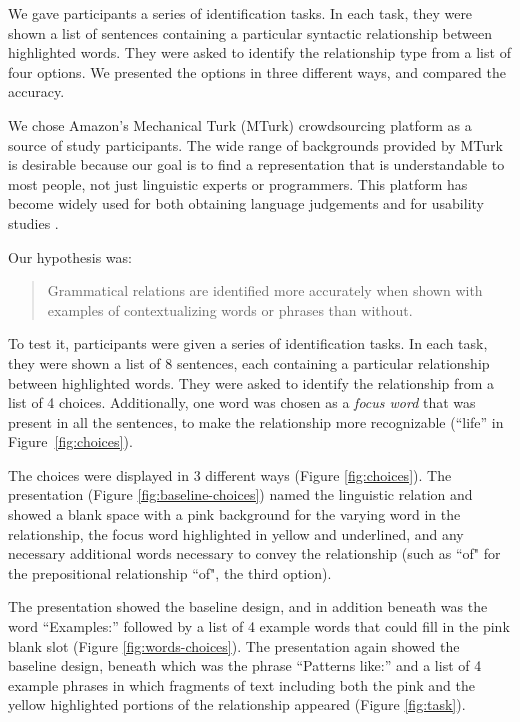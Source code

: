 We gave participants a series of identification tasks. In each task, they were shown a list of sentences containing a particular syntactic relationship between highlighted words. They were asked to identify the relationship type from a list of four options. We presented the options in three different ways, and compared the accuracy.

We chose Amazon's Mechanical Turk (MTurk) crowdsourcing platform as a source of study participants. The wide range of backgrounds provided by MTurk is desirable because our goal is to find a representation that is understandable to most people, not just linguistic experts or programmers.  This platform has become widely used for both obtaining language judgements and for usability studies \cite{kittur2008crowdsourcing,snow2008cheap}.


Our hypothesis was:
\begin{quote}
	Grammatical relations are identified more accurately when shown with examples of contextualizing words or phrases than without.
\end{quote}

To test it, participants were given a series of identification tasks. In each task, they were shown a list of 8 sentences, each containing a particular relationship between highlighted words. They were asked to identify the relationship from a list of 4 choices.  Additionally, one word was chosen as a \emph{focus word} that was present in all the sentences, to make the relationship more recognizable (``life'' in Figure~\ref{fig:choices}).

The choices were displayed in 3 different ways (Figure \ref{fig:choices}).  The  presentation
(Figure \ref{fig:baseline-choices}) named the linguistic relation and showed a blank space with a pink background for the varying word in the relationship, the focus word highlighted in yellow and underlined, and any necessary additional words necessary to convey the relationship (such as ``of" for the prepositional relationship ``of",  the third option).

The  presentation showed the baseline design, and in addition beneath was the word ``Examples:'' followed by a list of 4 example words that could fill in the pink blank slot (Figure \ref{fig:words-choices}).   The  presentation again showed the baseline design, beneath which was the phrase ``Patterns like:'' and a list of 4 example phrases in which fragments of text including both the pink and the yellow highlighted portions of the  relationship appeared (Figure \ref{fig:task}).


